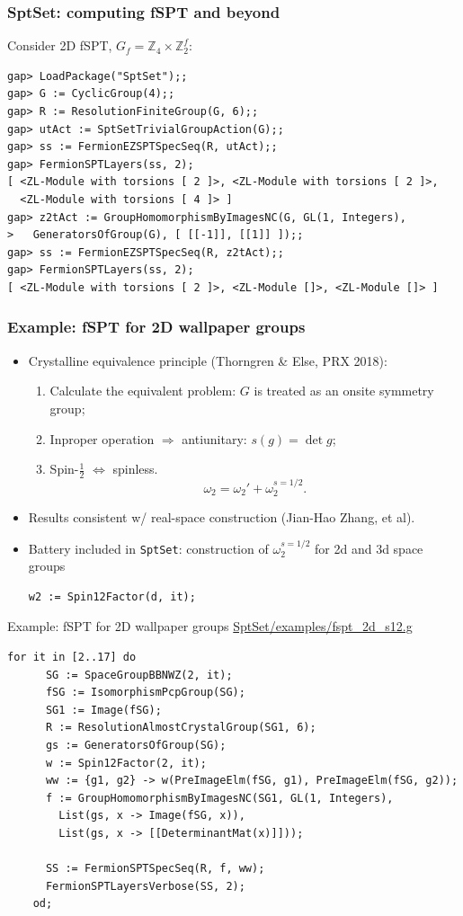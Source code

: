 \documentclass[xcolor=table, aspectratio=169]{beamer}
\begin{document}
\begin{frame}[fragile]
	\frametitle{SptSet: computing fSPT and beyond}
	Consider 2D fSPT, $G_f=\mathbb Z_4\times\mathbb Z_2^f$:
\begin{lstlisting}[basicstyle=\footnotesize]
gap> LoadPackage("SptSet");;
gap> G := CyclicGroup(4);;
gap> R := ResolutionFiniteGroup(G, 6);;
gap> utAct := SptSetTrivialGroupAction(G);;
gap> ss := FermionEZSPTSpecSeq(R, utAct);;
gap> FermionSPTLayers(ss, 2);
[ <ZL-Module with torsions [ 2 ]>, <ZL-Module with torsions [ 2 ]>,
  <ZL-Module with torsions [ 4 ]> ]
gap> z2tAct := GroupHomomorphismByImagesNC(G, GL(1, Integers),
>   GeneratorsOfGroup(G), [ [[-1]], [[1]] ]);;
gap> ss := FermionEZSPTSpecSeq(R, z2tAct);;
gap> FermionSPTLayers(ss, 2);
[ <ZL-Module with torsions [ 2 ]>, <ZL-Module []>, <ZL-Module []> ]
\end{lstlisting}

\end{frame}

\begin{frame}[fragile]
  \frametitle{Example: fSPT for 2D wallpaper groups}
  \begin{itemize}
  \item Crystalline equivalence principle (Thorngren \& Else, PRX 2018):
  \begin{enumerate}
	\item Calculate the equivalent problem: $G$ is treated as an \alert{onsite} symmetry group;
	\item Inproper operation $\Rightarrow$ antiunitary: $s(g) = \det g$;
	\item Spin-$\frac12$ $\Leftrightarrow$ spinless.
	\[\omega_2 = \omega_2' + \omega_2^{s=1/2}.\]
  \end{enumerate}
  \item Results consistent w/ real-space construction (Jian-Hao Zhang, et al).
  \item Battery included in \lstinline|SptSet|: construction of $\omega_2^{s=1/2}$ for 2d and 3d space groups
  \begin{lstlisting}[basicstyle=\footnotesize]
	w2 := Spin12Factor(d, it);
  \end{lstlisting}
\end{itemize}
\end{frame}

\begin{frame}[fragile]{Example: fSPT for 2D wallpaper groups}
	\url{SptSet/examples/fspt_2d_s12.g}
	\begin{lstlisting}[basicstyle=\footnotesize]
    for it in [2..17] do
      SG := SpaceGroupBBNWZ(2, it);
      fSG := IsomorphismPcpGroup(SG);
      SG1 := Image(fSG);
      R := ResolutionAlmostCrystalGroup(SG1, 6);
      gs := GeneratorsOfGroup(SG);
      w := Spin12Factor(2, it);
      ww := {g1, g2} -> w(PreImageElm(fSG, g1), PreImageElm(fSG, g2));
      f := GroupHomomorphismByImagesNC(SG1, GL(1, Integers),
        List(gs, x -> Image(fSG, x)),
        List(gs, x -> [[DeterminantMat(x)]]));

      SS := FermionSPTSpecSeq(R, f, ww);
      FermionSPTLayersVerbose(SS, 2);
    od;
  \end{lstlisting}
\end{frame}
\end{document}
